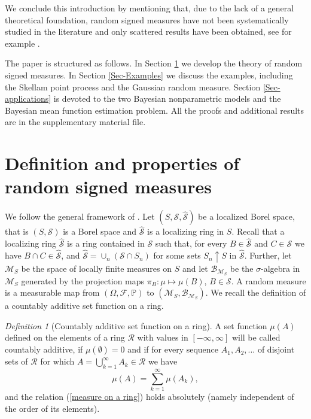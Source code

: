 \documentclass{article}
\theoremstyle{plain}
\theoremstyle{remark}
\newtheorem{definition}[theorem]{Definition}
\begin{document}
We conclude this introduction by mentioning that, due to the lack of a general theoretical foundation, random signed measures have not been systematically studied in the literature and only scattered results have been obtained, see for example \citet{cohen,HELLMUND,Horo-Gauss,Jacob1995,Karr,Molchanov2019,nickl2009convergence}.

The paper is structured as follows. In Section \ref{Sec-measure} we develop the theory of random signed measures. In Section \ref{Sec-Examples} we discuss the examples, including the Skellam point process and the Gaussian random measure. Section \ref{Sec-applications} is devoted to the two Bayesian nonparametric models and the Bayesian mean function estimation problem. All the proofs and additional results are in the supplementary material file.






\section{Definition and properties of random signed measures}\label{Sec-measure}
We follow the general framework of \citet{Kallenberg2}. Let $(S,\mathcal{S},\hat{\mathcal{S}})$ be a localized Borel space, that is $(S,\mathcal{S})$ is a Borel space and $\hat{\mathcal{S}}$ is a localizing ring in $S$. Recall that a localizing ring $\hat{\mathcal{S}}$ is a ring contained in $\mathcal{S}$ such that, for every $B\in\hat{\mathcal{S}}$ and $C\in\mathcal{S}$ we have $B\cap C\in\hat{\mathcal{S}}$, and $\hat{\mathcal{S}}=\cup_n(\mathcal{S}\cap S_n)$ for some sets $S_n\uparrow S$ in $\hat{\mathcal{S}}$. Further, let $\mathcal{M}_S$ be the space of locally finite measures on $S$ and let $\mathcal{B}_{\mathcal{M}_S}$ be the $\sigma$-algebra in $\mathcal{M}_S$ generated by the projection maps $\pi_{B}:\mu\mapsto\mu(B)$, $B\in\mathcal{S}$. A random measure is a measurable map from  $(\Omega,\mathcal{F},\mathbb{P})$ to $(\mathcal{M}_{S},\mathcal{B}_{\mathcal{M}_S})$. 
We recall the definition of a countably additive set function on a ring.

\begin{definition}[Countably additive set function on a ring] \label{Def-signedmeasure-ring} A set function $\mu(A)$ defined on the elements of a ring $\mathcal{R}$ with values in $[-\infty,\infty]$ will be called countably additive, if $\mu(\emptyset)=0$ and if for every sequence $A_{1},A_{2}, . . .$ of disjoint sets of $\mathcal{R}$ for which $A=\bigcup_{k=1}^{\infty}A_{k}\in\mathcal{R}$ we have
	\begin{equation}\label{measure on a ring}
		\mu(A)=\sum_{k=1}^{\infty}\mu(A_{k}),
	\end{equation}
	and the relation (\ref{measure on a ring}) holds absolutely (namely independent of the order of its elements).
\end{definition}
\end{document}
